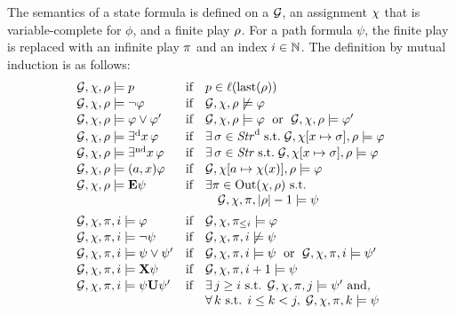 \begin{definition}
\label{def-SLi-semantics}
The semantics of a state formula is defined on a \CGS $\CGS$, an
assignment  $\chi$ that is variable-complete for $\phi$, and a
finite play $\rho$. For a path formula $\psi$, the finite play is
replaced with an infinite play $\pi$ and an index $i\in\mathbb N$. The
definition by mutual induction is as follows:
\[
\begin{array}{lcl}
 \CGS,\assign,\fplay\modelsSL p & \text{if} & p\in\val(\last(\fplay))\\[1pt]
 \CGS,\assign,\fplay\modelsSL \neg\phi & \text{if} &
  \CGS,\assign,\fplay\not\modelsSL\phi\\[1pt]
 \CGS,\assign,\fplay\modelsSL \phi\ou\phi' & \text{if} &
  \CGS,\assign,\fplay\modelsSL\phi \;\text{ or }\;
  \CGS,\assign,\fplay\modelsSL\phi' \\[1pt]
 \CGS,\assign,\fplay\modelsSL\Estratd\phi  & \text{if} & 
\exists\,   \strat\in\setstratd \;\text{s.t.} \;
                                                           \CGS,\assign[\var\mapsto\strat],\fplay\modelsSL \phi\\[1pt]
 \CGS,\assign,\fplay\modelsSL\Estratnd\phi  & \text{if} & 
\exists\,   \strat\in\setstratnd \;\text{s.t.} \;
    \CGS,\assign[\var\mapsto\strat],\fplay\modelsSL \phi\\[1pt]  
 \CGS,\assign,\fplay\modelsSL \bind{\var}\phi & \text{if} &
 \CGS,\assign[\ag\mapsto\assign(\var)],\fplay\modelsSL \phi\\[1pt]  
 \CGS,\assign,\fplay\modelsSL \Eout\psi & \text{if} & \exists\iplay \in
                                                         \out(\assign,\fplay)
                                                         \text{ s.t. }
  \\
  & &\quad   \CGS,\assign,\iplay,|\fplay|-1\modelsSL \psi\\[5pt]
    \CGS,\assign,\iplay,i\modelsSL \phi & \text{if} &
                                                         \CGS,\assign,\iplay_{\leq i}\modelsSL\phi\\[1pt]
   \CGS,\assign,\iplay,i\modelsSL \neg\psi & \text{if} &
  \CGS,\assign,\iplay,i\not\modelsSL\psi\\[1pt]
 \CGS,\assign,\iplay,i\modelsSL \psi\ou\psi' & \text{if} &
  \CGS,\assign,\iplay,i\modelsSL\psi \;\text{ or }\;
  \CGS,\assign,\iplay,i\modelsSL\psi' \\[1pt]
  \CGS,\assign,\iplay,i\modelsSL\X\psi & \text{if} &
  \CGS,\assign,\iplay,i+1\modelsSL\psi\\[1pt]
\CGS,\assign,\iplay,i\modelsSL\psi\until\psi' & \text{if} & \exists\, j\geq i
   \mbox{ s.t. }\CGS,\assign,\iplay,j\modelsSL \psi' \text{ and,}\\ 
   & & \forall\, k \text{ s.t. } i\leq k <j,
\; \CGS,\assign,\iplay,k\modelsSL \psi
\end{array}
\]
\end{definition}


